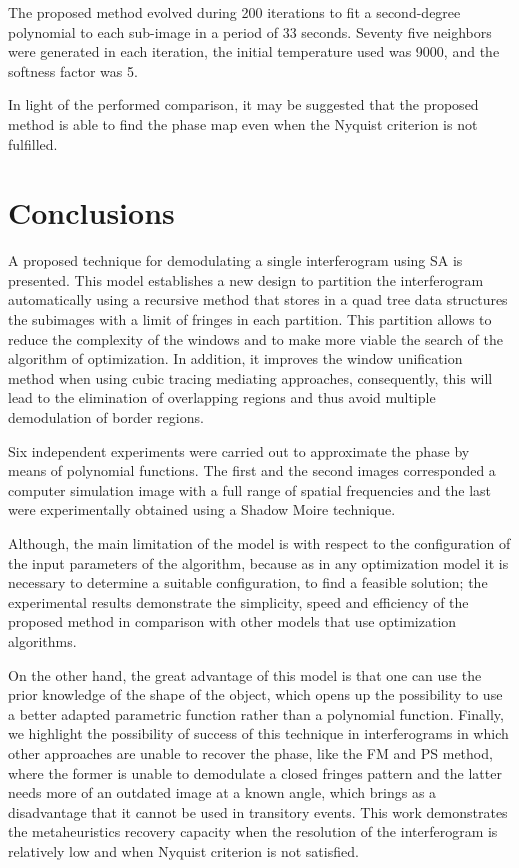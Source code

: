 \documentclass[review]{elsarticle}
\begin{document}
The proposed method evolved during 200 iterations to fit a second-degree polynomial to each sub-image in a period of 33 seconds. Seventy five neighbors were generated in each iteration, the initial temperature used was 9000, and the softness factor was 5. 

In light of the performed comparison, it may be suggested that the proposed method is able to find the phase map even when the Nyquist criterion is not fulfilled.

\section{Conclusions}
A proposed technique for demodulating a single interferogram using SA is presented. This model establishes a new design to partition the interferogram automatically using a recursive method that stores in a quad tree data structures the subimages with a limit of fringes in each partition. This partition allows to reduce the complexity of the windows and to make more viable the search of the algorithm of optimization. In addition, it improves the window unification method when using cubic tracing mediating approaches, consequently, this will lead to the elimination of overlapping regions and thus avoid multiple demodulation of border regions.

Six independent experiments were carried out to approximate the phase by means of polynomial functions. The first and the second images corresponded a computer simulation image with a full range of spatial frequencies and the last were experimentally obtained using a Shadow Moire technique.

Although, the main limitation of the model is with respect to the configuration of the input parameters of the algorithm, because as in any optimization model it is necessary to determine a suitable configuration, to find a feasible solution; the experimental results demonstrate the simplicity, speed and efficiency of the proposed method in comparison with other models that use optimization algorithms.

On the other hand, the great advantage of this model is that one can use the prior knowledge of the shape of the object, which opens up the possibility to use a better adapted parametric function rather than a polynomial function. Finally, we highlight the possibility of success of this technique in interferograms in which other approaches are unable to recover the phase, like the FM and PS method, where the former is unable to demodulate a closed fringes pattern and the latter needs more of an outdated image at a known angle, which brings as a disadvantage that it cannot be used in transitory events. This work demonstrates the metaheuristics recovery capacity when the resolution of the interferogram is relatively low and when Nyquist criterion is not satisfied.
\end{document}
